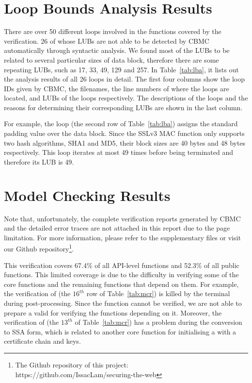 \section{Loop Bounds Analysis Results}
There are over 50 different loops involved in the functions covered by the verification. 26 of whose LUBs are not able to be detected by CBMC automatically through syntactic analysis. We found most of the LUBs to be related to several particular sizes of data block, therefore there are some repeating LUBs, such as 17, 33, 49, 129 and 257. In Table~\ref{tab:lba}, it lists out the analysis results of all 26 loops in detail. The first four columns show the loop IDs given by CBMC, the filenames, the line numbers of where the loops are located, and LUBs of the loops respectively. The descriptions of the loops and the reasons for determining their corresponding LUBs are shown in the last column. 

For example, the loop  (the second row of Table~\ref{tab:lba}) assigns the standard padding value over the data block. Since the SSLv3 MAC function only supports two hash algorithms, SHA1 and MD5, their block sizes are 40 bytes and 48 bytes respectively. This loop iterates at most 49 times before being terminated and therefore its LUB is 49.



\section{Model Checking Results}
\label{sec:mcr}
Note that, unfortunately, the complete verification reports generated by CBMC and the detailed error traces are not attached in this report due to the page limitation. For more information, please refer to the supplementary files or visit our Github repository\footnote{The Github repository of this project: https://github.com/IssacLam/securing-the-web}.

This verification covers 67.4\% of all API-level functions and 52.3\% of all public functions. This limited coverage is due to the difficulty in verifying some of the core functions and the remaining functions that depend on them.
For example, the verification of  (the $16^{th}$ row of Table~\ref{tab:mcr}) is killed by the terminal during post-processing. Since the function  cannot be verified, we are not able to prepare a valid  for verifying the functions depending on it. Moreover, the verification of  (the $13^{th}$ of Table~\ref{tab:mcr}) has a problem during the conversion to SSA form, which is related to another core function  for initialising a  with a certificate chain and keys.

